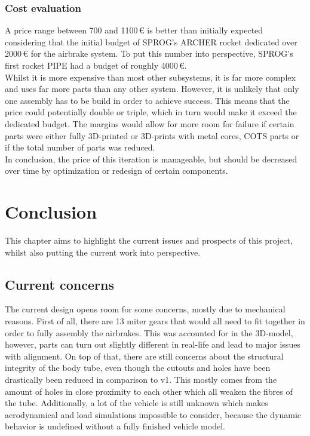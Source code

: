 \documentclass[fontsize=11pt,%
twoside,%
BCOR          = 8mm, %
DIV           = 11,  %
titlepage     = off,%
index=totoc,%
xcolor        = pdftex,%
dvipsnames,%
bibliography  = totoc,%
bibliography = numbered, %
listof        = notnumbered]{scrreprt}
\begin{document}
\subsection{Cost evaluation}
A price range between 700 and 1100\,€ is better than initially expected considering that the initial budget of SPROG's ARCHER rocket dedicated over 2000\,€ for the airbrake system. To put this number into perspective, SPROG's first rocket PIPE had a budget of roughly 4000\,€.\\
Whilst it is more expensive than most other subsystems, it is far more complex and uses far more parts than any other system. However, it is unlikely that only one assembly has to be build in order to achieve success. This means that the price could potentially double or triple, which in turn would make it exceed the dedicated budget. The margins would allow for more room for failure if certain parts were either fully 3D-printed or 3D-prints with metal cores, COTS parts or if the total number of parts was reduced.\\
In conclusion, the price of this iteration is manageable, but should be decreased over time by optimization or redesign of certain components.

\chapter{Conclusion}
This chapter aims to highlight the current issues and prospects of this project, whilst also putting the current work into perspective.

\section{Current concerns}
The current design opens room for some concerns, mostly due to mechanical reasons. First of all, there are 13 miter gears that would all need to fit together in order to fully assembly the airbrakes. This was accounted for in the 3D-model, however, parts can turn out slightly different in real-life and lead to major issues with alignment. On top of that, there are still concerns about the structural integrity of the body tube, even though the cutouts and holes have been drastically been reduced in comparison to v1. This mostly comes from the amount of holes in close proximity to each other which all weaken the fibres of the tube. Additionally, a lot of the vehicle is still unknown which makes aerodynamical and load simulations impossible to consider, because the dynamic behavior is undefined without a fully finished vehicle model.
\end{document}
